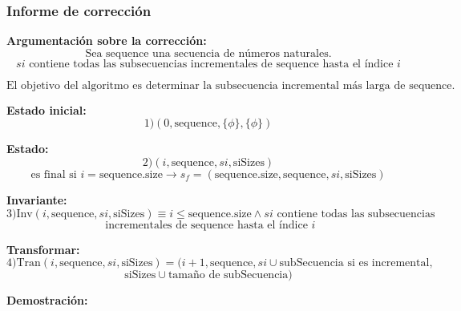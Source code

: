 \documentclass[12pt, a4paper]{article}
\begin{document}
\subsubsection{Informe de corrección}
\textbf{Argumentación sobre la corrección: \\}
\[ \text{Sea } \text{sequence} \text{ una secuencia de números naturales.} \]
\[ si \text{ contiene todas las subsecuencias incrementales de } \text{sequence} \text{ hasta el índice } i \]

\[ \text{El objetivo del algoritmo es determinar la subsecuencia incremental más larga de } \text{sequence}. \]

\textbf{Estado inicial:}
\[ 1) (0, \text{sequence}, \{\phi\}, \{\phi\}) \]

\textbf{Estado:}
\[ 2) (i, \text{sequence}, si, \text{siSizes}) \]
\[ \text{es final si } i = \text{sequence.size} \rightarrow s_f = (\text{sequence.size}, \text{sequence}, si, \text{siSizes}) \]

\textbf{Invariante:}
\[ 3) \text{Inv}(i, \text{sequence}, si, \text{siSizes}) \equiv i \leq \text{sequence.size} \land si \text{ contiene todas las subsecuencias} \]
\[ \text{ incrementales de } \text{sequence} \text{ hasta el índice } i \]

\textbf{Transformar:}
\[ 4) \text{Tran}(i, \text{sequence}, si, \text{siSizes}) = (i+1, \text{sequence}, si \cup \text{subSecuencia} \text{ si es incremental}, \]
\[ \text{siSizes} \cup \text{tamaño de subSecuencia}) \]

\textbf{Demostración:}
\end{document}
